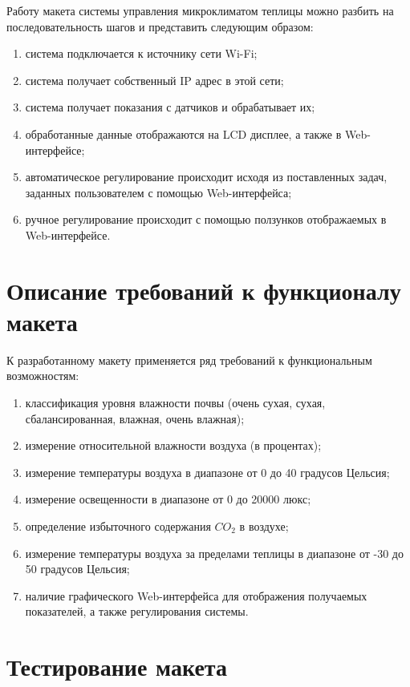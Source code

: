 Работу макета системы управления микроклиматом теплицы можно разбить на последовательность шагов и представить следующим образом:

\begin{enumerate}
    \item система подключается к источнику сети Wi-Fi;
    \item система получает собственный IP адрес в этой сети;
    \item система получает показания с датчиков и обрабатывает их;
    \item обработанные данные отображаются на LCD дисплее, а также в Web-интерфейсе;
    \item автоматическое регулирование происходит исходя из поставленных задач, заданных пользователем с помощью Web-интерфейса;
    \item ручное регулирование происходит с помощью ползунков отображаемых в Web-интерфейсе. 
\end{enumerate}

\section{Описание требований к функционалу макета}

К разработанному макету применяется ряд требований к функциональным возможностям:

\begin{enumerate}
    \item классификация уровня влажности почвы (очень сухая, сухая, сбалансированная, влажная, очень влажная);
    \item измерение относительной влажности воздуха (в процентах);
    \item измерение температуры воздуха в диапазоне от 0 до 40 градусов Цельсия;
    \item измерение освещенности в диапазоне от 0 до 20000 люкс;
    \item определение избыточного содержания $CO_2$ в воздухе;
    \item измерение температуры воздуха за пределами теплицы в диапазоне от -30 до 50 градусов Цельсия;
    \item наличие графического Web-интерфейса для отображения получаемых показателей, а также регулирования системы.
\end{enumerate}

\section{Тестирование макета}

